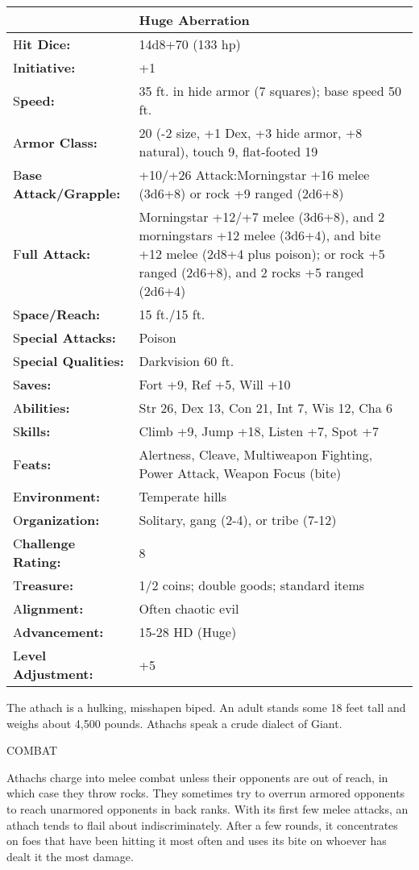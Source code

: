 \documentclass{article}
\begin{document}
\begin{tabular}{|>{\raggedright}p{91pt}|>{\raggedright}p{204pt}|}
\hline
  & Huge Aberration\tabularnewline
\hline
H\textbf{it Dice:} & 14d8+70 (133 hp)\tabularnewline
\hline
I\textbf{nitiative:} & +1\tabularnewline
\hline
S\textbf{peed:} & 35 ft. in hide armor (7 squares); base speed 50 ft.\tabularnewline
\hline
A\textbf{rmor Class:} & 20 (-2 size, +1 Dex, +3 hide armor, +8 natural), touch 
9, flat-footed 19\tabularnewline
\hline
B\textbf{ase Attack/Grapple:} & +10/+26 Attack:Morningstar +16 melee (3d6+8) or 
rock +9 ranged (2d6+8)\tabularnewline
\hline
F\textbf{ull Attack:} & Morningstar +12/+7 melee (3d6+8), and 2 morningstars +12 
melee (3d6+4), and bite +12 melee (2d8+4 plus poison); or rock +5 ranged (2d6+8), 
and 2 rocks +5 ranged (2d6+4)\tabularnewline
\hline
S\textbf{pace/Reach:} & 15 ft./15 ft.\tabularnewline
\hline
S\textbf{pecial Attacks:} & Poison\tabularnewline
\hline
S\textbf{pecial Qualities:} & Darkvision 60 ft.\tabularnewline
\hline
S\textbf{aves:} & Fort +9, Ref +5, Will +10\tabularnewline
\hline
A\textbf{bilities:} & Str 26, Dex 13, Con 21, Int 7, Wis 12, Cha 6\tabularnewline
\hline
S\textbf{kills:} & Climb +9, Jump +18, Listen +7, Spot +7\tabularnewline
\hline
F\textbf{eats:} & Alertness, Cleave, Multiweapon Fighting, Power Attack, Weapon 
Focus (bite)\tabularnewline
\hline
E\textbf{nvironment:} & Temperate hills\tabularnewline
\hline
O\textbf{rganization:} & Solitary, gang (2-4), or tribe (7-12)\tabularnewline
\hline
C\textbf{hallenge Rating:} & 8\tabularnewline
\hline
T\textbf{reasure:} & 1/2 coins; double goods; standard items\tabularnewline
\hline
A\textbf{lignment:} & Often chaotic evil\tabularnewline
\hline
A\textbf{dvancement:} & 15-28 HD (Huge)\tabularnewline
\hline
L\textbf{evel Adjustment:} & +5\tabularnewline
\hline
\end{tabular}

The athach is a hulking, misshapen biped. An adult stands some 18 feet tall and 
weighs about 4,500 pounds. Athachs speak a crude dialect of Giant.

COMBAT

Athachs charge into melee combat unless their opponents are out of reach, in which 
case they throw rocks. They sometimes try to overrun armored opponents to reach 
unarmored opponents in back ranks. With its first few melee attacks, an athach 
tends to flail about indiscriminately. After a few rounds, it concentrates on foes 
that have been hitting it most often and uses its bite on whoever has dealt it 
the most damage.
\end{document}
